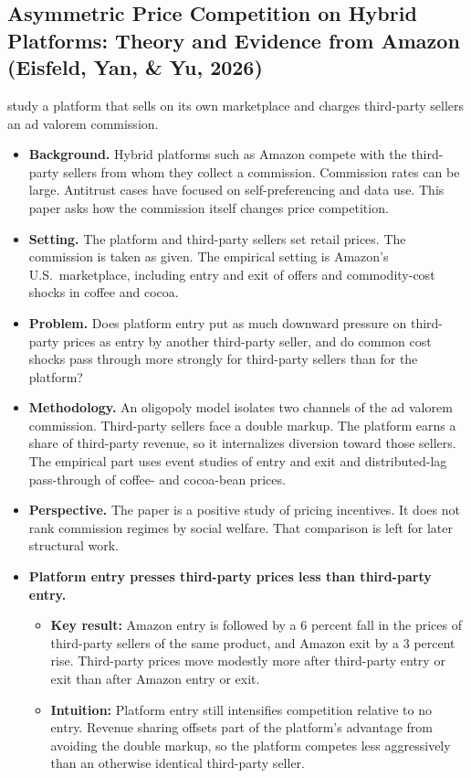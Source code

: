 \documentclass[11pt]{article}
\begin{document}
\subsection{Asymmetric Price Competition on Hybrid Platforms: Theory and Evidence from Amazon (Eisfeld, Yan, \& Yu, 2026)}

\citet{eisfeld_asymmetric_2026} study a platform that sells on its own
marketplace and charges third-party sellers an ad valorem commission.

\begin{itemize}
    \item \textbf{Background.}
    Hybrid platforms such as Amazon compete with the third-party sellers from
    whom they collect a commission.  Commission rates can be large.  Antitrust
    cases have focused on self-preferencing and data use.  This paper asks how
    the commission itself changes price competition.

    \item \textbf{Setting.}
    The platform and third-party sellers set retail prices.  The commission is
    taken as given.  The empirical setting is Amazon's U.S.\ marketplace,
    including entry and exit of offers and commodity-cost shocks in coffee and
    cocoa.

    \item \textbf{Problem.}
    Does platform entry put as much downward pressure on third-party prices as
    entry by another third-party seller, and do common cost shocks pass
    through more strongly for third-party sellers than for the platform?

    \item \textbf{Methodology.}
    An oligopoly model isolates two channels of the ad valorem commission.
    Third-party sellers face a double markup.  The platform earns a share of
    third-party revenue, so it internalizes diversion toward those sellers.
    The empirical part uses event studies of entry and exit and distributed-lag
    pass-through of coffee- and cocoa-bean prices.

    \item \textbf{Perspective.}
    The paper is a positive study of pricing incentives.  It does not rank
    commission regimes by social welfare.  That comparison is left for later
    structural work.

    \item \textbf{Platform entry presses third-party prices less than third-party entry.}
    \begin{itemize}
        \item \textbf{Key result:} Amazon entry is followed by a 6 percent
        fall in the prices of third-party sellers of the same product, and
        Amazon exit by a 3 percent rise.  Third-party prices move modestly
        more after third-party entry or exit than after Amazon entry or exit.
        \item \textbf{Intuition:} Platform entry still intensifies competition
        relative to no entry.  Revenue sharing offsets part of the platform's
        advantage from avoiding the double markup, so the platform competes
        less aggressively than an otherwise identical third-party seller.
    \end{itemize}


\end{itemize}
\end{document}
